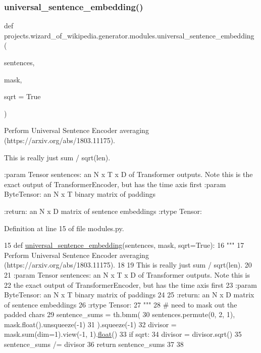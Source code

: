 \subsubsection{\texorpdfstring{universal\+\_\+sentence\+\_\+embedding()}{universal\_sentence\_embedding()}}
{\footnotesize\ttfamily def projects.\+wizard\+\_\+of\+\_\+wikipedia.\+generator.\+modules.\+universal\+\_\+sentence\+\_\+embedding (\begin{DoxyParamCaption}\item[{}]{sentences,  }\item[{}]{mask,  }\item[{}]{sqrt = {\ttfamily True} }\end{DoxyParamCaption})}

\begin{DoxyVerb}Perform Universal Sentence Encoder averaging (https://arxiv.org/abs/1803.11175).

This is really just sum / sqrt(len).

:param Tensor sentences: an N x T x D of Transformer outputs. Note this is
    the exact output of TransformerEncoder, but has the time axis first
:param ByteTensor: an N x T binary matrix of paddings

:return: an N x D matrix of sentence embeddings
:rtype Tensor:
\end{DoxyVerb}
 

Definition at line 15 of file modules.\+py.


\begin{DoxyCode}
15 \textcolor{keyword}{def }\hyperlink{namespaceprojects_1_1wizard__of__wikipedia_1_1generator_1_1modules_aa0e28a2592caa75f5c687c6200d2a68d}{universal\_sentence\_embedding}(sentences, mask, sqrt=True):
16     \textcolor{stringliteral}{"""}
17 \textcolor{stringliteral}{    Perform Universal Sentence Encoder averaging (https://arxiv.org/abs/1803.11175).}
18 \textcolor{stringliteral}{}
19 \textcolor{stringliteral}{    This is really just sum / sqrt(len).}
20 \textcolor{stringliteral}{}
21 \textcolor{stringliteral}{    :param Tensor sentences: an N x T x D of Transformer outputs. Note this is}
22 \textcolor{stringliteral}{        the exact output of TransformerEncoder, but has the time axis first}
23 \textcolor{stringliteral}{    :param ByteTensor: an N x T binary matrix of paddings}
24 \textcolor{stringliteral}{}
25 \textcolor{stringliteral}{    :return: an N x D matrix of sentence embeddings}
26 \textcolor{stringliteral}{    :rtype Tensor:}
27 \textcolor{stringliteral}{    """}
28     \textcolor{comment}{# need to mask out the padded chars}
29     sentence\_sums = th.bmm(
30         sentences.permute(0, 2, 1), mask.float().unsqueeze(-1)
31     ).squeeze(-1)
32     divisor = mask.sum(dim=1).view(-1, 1).\hyperlink{namespaceprojects_1_1controllable__dialogue_1_1make__control__dataset_aa2b7207688c641dbc094ab44eca27113}{float}()
33     \textcolor{keywordflow}{if} sqrt:
34         divisor = divisor.sqrt()
35     sentence\_sums /= divisor
36     \textcolor{keywordflow}{return} sentence\_sums
37 
38 
\end{DoxyCode}
